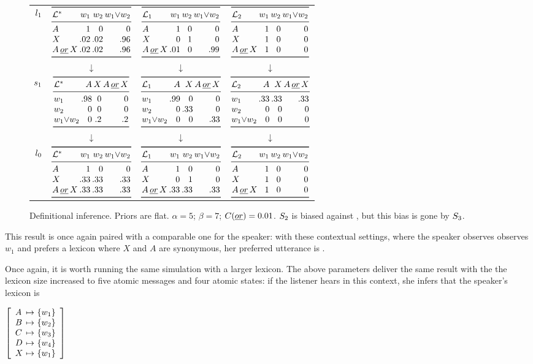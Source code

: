 \documentclass{article}
\begin{document}
\begin{figure}[tp]
\begin{tabular}[c]{@{}  r@{ }c c c  @{}}
    \\
    $\listenerOne$ & $\lismat{\LexStar}{1 & 0 & 0}{.02 & .02 & .96}{.02 & .02 & .96}$ &  $\lismat{\Lex_{1}}{1 & 0 & 0}{0 & 1 & 0}{.01 & 0 & .99}$ & $\lismat{\Lex_{2}}{1 & 0 & 0}{1 & 0 & 0}{1 & 0 & 0}$
    \\
    & $\downarrow$ & $\downarrow$ & $\downarrow$
    \\
    $\speakerOne$ & $\spkmat{\LexStar}{.98 & 0 & 0}{0 & 0 & 0}{0 & .2 & .2}$ & $\spkmat{\Lex_{1}}{.99 & 0 & 0}{0 & .33 & 0}{0 & 0 & .33}$ & $\spkmat{\Lex_{2}}{.33 & .33 & .33}{0 & 0 & 0}{0 & 0 & 0}$
    \\
    & $\downarrow$ & $\downarrow$ & $\downarrow$
    \\
    $\listenerZero$ & $\lismat{\LexStar}{1 & 0 & 0}{.33 & .33 & .33}{.33 & .33 & .33}$ & $\lismat{\Lex_{1}}{1 & 0 & 0}{0 & 1 & 0}{.33 & .33 & .33}$ & $\lismat{\Lex_{2}}{1 & 0 & 0}{1 & 0 & 0}{1 & 0 & 0}$
  \end{tabular}
  \caption{Definitional inference.
    Priors are flat. 
    $\alpha = 5$; 
    $\beta = 7$; 
    $\Costs(\word{or}) = 0.01$.
    $\SpeakerK[2]$ is biased against , but this bias is gone by $\SpeakerK[3]$.}
  \label{fig:def}
\end{figure}

This result is once again paired with a comparable one for the
speaker: with these contextual settings, where the speaker observes
observes $w_{1}$ and prefers a lexicon where $X$ and $A$ are
synonymous, her preferred utterance is .

Once again, it is worth running the same simulation with a larger
lexicon. The above parameters deliver the same result with the the
lexicon size increased to five atomic messages and four atomic states:
if the listener hears  in this context, she infers
that the speaker's lexicon is 
%
\begin{examples}
\item\label{def-lex-large}
  $\left[
    \begin{array}[c]{l@{ \ \mapsto \ }l}
      A & \set{w_{1}} \\
      B & \set{w_{2}} \\
      C & \set{w_{3}} \\
      D & \set{w_{4}} \\
      X & \set{w_{1}}
    \end{array}
  \right]$
\end{examples}
\end{document}
